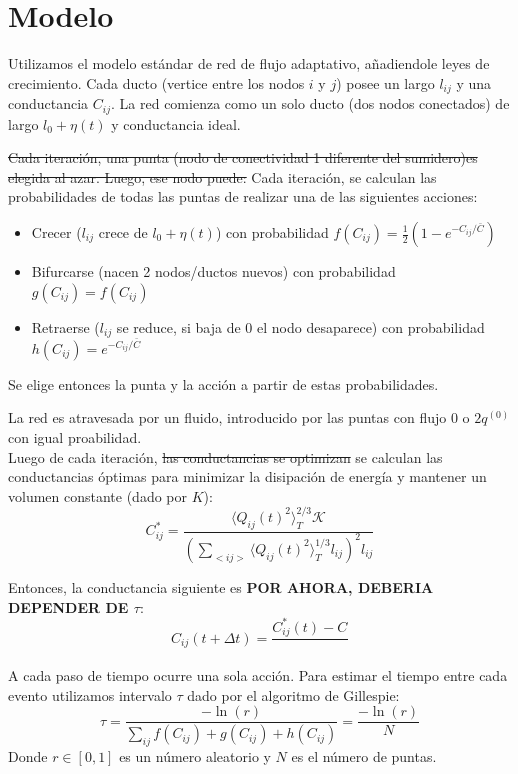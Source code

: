 \documentclass{article}
\begin{document}
\section{Modelo}

Utilizamos el modelo estándar de red de flujo adaptativo, añadiendole leyes de crecimiento. Cada ducto (vertice entre los nodos $i$ y $j$) posee un largo $l_{ij}$ y
una conductancia $C_{ij}$. La red comienza como un solo ducto (dos nodos conectados) de largo $l_0 + \eta (t)$ y conductancia ideal. 

\st{Cada iteración, una punta (nodo de conectividad 1 diferente del sumidero)es elegida al azar. Luego, ese nodo puede:}
Cada iteración, se calculan las probabilidades de todas las puntas de realizar una de las siguientes acciones:
\begin{itemize}

    \item Crecer ($l_{ij}$ crece de $l_0 + \eta (t)$) con probabilidad $f(C_{ij}) = \frac{1}{2}(1 - e^{-C_{ij}/\bar{C}})$
    \item Bifurcarse (nacen 2 nodos/ductos nuevos) con probabilidad $g(C_{ij}) = f(C_{ij})$
    \item Retraerse ($l_{ij}$ se reduce, si baja de 0 el nodo desaparece) con probabilidad $h(C_{ij}) = e^{-C_{ij}/\bar{C}}$

\end{itemize} 

Se elige entonces la punta y la acción a partir de estas probabilidades.

La red es atravesada por un fluido, introducido por las puntas con flujo $0$ o $2q^{(0)}$ con igual proabilidad.\\
Luego de cada iteración, \st{las conductancias se optimizan} se calculan las conductancias óptimas para minimizar la disipación de energía y mantener un volumen constante (dado por $K$):
$$ C_{ij}^* = \frac{\langle Q_{ij}(t)^2\rangle_T^{2/3} \mathcal{K}}{\left( \sum_{<ij>} \langle Q_{ij}(t)^2\rangle_T^{1/3} l_{ij}\right)^2 l_{ij}} $$

Entonces, la conductancia siguiente es \textbf{POR AHORA, DEBERIA DEPENDER DE $\tau$}:
$$ C_{ij}(t + \Delta t) = \frac{C_{ij}^*(t) - C_{}}{} $$

A cada paso de tiempo ocurre una sola acción. Para estimar el tiempo entre cada evento utilizamos intervalo $\tau$ dado por
el algoritmo de Gillespie: 
$$\tau = \frac{-\ln(r)}{\sum_{ij}f(C_{ij})+g(C_{ij})+h(C_{ij})} = \frac{-\ln(r)}{N}$$
Donde $r\in[0,1]$ es un número aleatorio y $N$ es el número de puntas.
\end{document}
